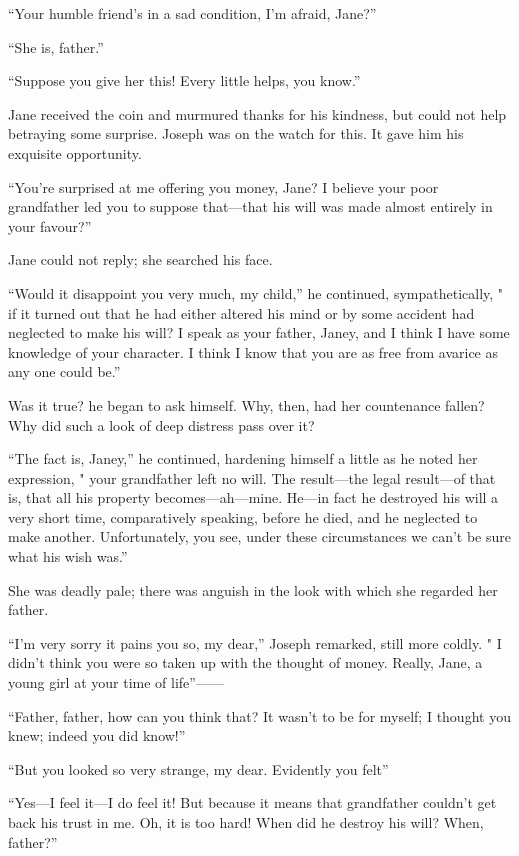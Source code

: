 ``Your humble friend's in a sad condition, I'm afraid, Jane?''

``She is, father.''

``Suppose you give her this! Every little helps, you know.''

Jane received the coin and murmured thanks for his kindness, but could
not help betraying some surprise. Joseph was on the watch for this. It
gave him his exquisite opportunity.

``You're surprised at me offering you money, Jane? I believe your poor
grandfather led you to suppose that---that his will was made almost
entirely in your favour?''

Jane could not reply; she searched his face.

``Would it disappoint you very much, my child,'' he continued,
sympathetically, " if it turned out that he had either altered his mind
{}or by some accident had neglected to make his will? I speak as your
father, Janey, and I think I have some knowledge of your character. I
think I know that you are as free from avarice as any one could be.''

Was it true? he began to ask himself. Why, then, had her countenance
fallen? Why did such a look of deep distress pass over it?

``The fact is, Janey,'' he continued, hardening himself a little as he
noted her expression, " your grandfather left no will. The result---the
legal result---of that is, that all his property becomes---ah---mine.
He---in fact he destroyed his will a very short time, comparatively
speaking, before he died, and he neglected to make another.
Unfortunately, you see, under these circumstances we can't be sure what
his wish was.''

She was deadly pale; there was anguish in the look with which she
regarded her father.

``I'm very sorry it pains you so, my dear,'' Joseph remarked, still more
coldly. " I didn't think you were so taken up with the thought of money.
Really, Jane, a young girl at your time of life''{{------}}

``Father, father, how can you think that? {}It wasn't to be for myself;
I thought you knew; indeed you did know!''

``But you looked so very strange, my dear. Evidently you felt''

``Yes---I feel it---I do feel it! But because it means that grandfather
couldn't get back his trust in me. Oh, it is too hard! When did he
destroy his will? When, father?''

